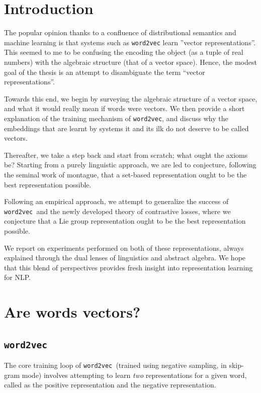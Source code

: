 \documentclass{book}
\newcommand{\wtov}{\texttt{word2vec }}
\begin{document}
\tableofcontents
\chapter{Introduction}

The popular opinion thanks to a confluence of distributional semantics
and machine learning is that systems such as \texttt{word2vec} learn
''vector representations''. This seemed to me to be confusing the encoding
the object (as a tuple of real numbers) with the algebraic structure
(that of a vector space). Hence, the modest goal of the thesis is an
attempt to disambiguate the term ``vector representations''.

Towards this end, we begin by surveying the algebraic structure of a vector
space, and what it would really mean if words were vectors. We then provide
a short explanation of the training mechanism of \texttt{word2vec}, and
discuss why the embeddings that are learnt by systems it and its ilk do not
deserve to be called vectors. 

Thereafter, we take a step back and start from scratch; what ought the axioms
be? Starting from a purely linguistic approach, we are led to conjecture, following
the seminal work of montague, that a set-based representation ought to be
the best representation possible.

Following an empirical approach, we attempt to generalize the success
of \wtov and the newly developed theory of contrastive losses, where we conjecture
that a Lie group representation ought to be the best representation possible.

We report on experiments performed on both of these representations, always
explained through the dual lenses of linguistics and abstract algebra. We hope
that this blend of perspectives provides fresh insight into representation
learning for NLP.

\chapter{Are words vectors?}


\section{\wtov}

The core training loop of \wtov (trained using negative sampling, in skip-gram
mode) involves attempting to learn \emph{two} representations for a given word,
called as the positive representation and the negative representation.
\end{document}
